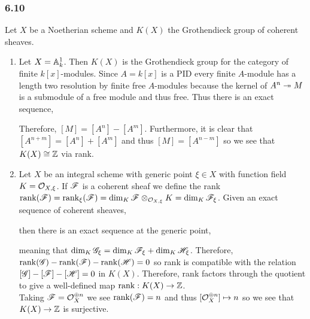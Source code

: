 \documentclass[12pt]{article}
\begin{document}
\subsubsection{6.10}

Let $X$ be a Noetherian scheme and $K(X)$ the Grothendieck group of coherent sheaves.

\begin{enumerate}
\item Let $X = \mathbb{A}^1_k$. Then $K(X)$ is the Grothendieck group for the category of finite $k[x]$-modules. Since $A = k[x]$ is a PID every finite $A$-module has a length two resolution by finite free $A$-modules because the kernel of $A^n \twoheadrightarrow M$ is a submodule of a free module and thus free. Thus there is an exact sequence,
\begin{center}
\end{center}
Therefore, $[M] = [A^n] - [A^m]$. Furthermore, it is clear that $[A^{n+m}] = [A^n] + [A^m]$ and thus $[M] = [A^{n-m}]$ so we see that $K(X) \cong \mathbb{Z}$ via rank. 
\item Let $X$ be an integral scheme with generic point $\xi \in X$ with function field $K = \mathcal{O}_{X, \xi}$. If $\mathscr{F}$ is a coherent sheaf we define the rank $\mathrm{rank}(\mathscr{F}) = \mathrm{rank}_\xi(\mathscr{F}) = \dim_K \mathscr{F} \otimes_{\mathcal{O}_{X, \xi}} K = \dim_K \mathscr{F}_\xi$. Given an exact sequence of coherent sheaves,
\begin{center}
\end{center}
then there is an exact sequence at the generic point,
\begin{center}
\end{center}
meaning that $\dim_K \mathscr{G}_\xi = \dim_K \mathscr{F}_\xi + \dim_K \mathscr{H}_\xi$. Therefore, $\mathrm{rank}(\mathscr{G}) - \mathrm{rank}(\mathscr{F}) - \mathrm{rank}(\mathscr{H}) = 0$ so rank is compatible with the relation $[\mathscr{G}] - [\mathscr{F}] - [\mathscr{H}] = 0$ in $K(X)$. Therefore, rank factors through the quotient to give a well-defined map $\mathrm{rank} : K(X) \to \mathbb{Z}$.
\bigskip\\
Taking $\mathscr{F} = \mathcal{O}_{X}^{\oplus n}$ we see $\mathrm{rank}(\mathscr{F}) = n$ and thus $[\mathcal{O}_{X}^{\oplus n}] \mapsto n$ so we see that $K(X) \to \mathbb{Z}$ is surjective.


\end{enumerate}
\end{document}
